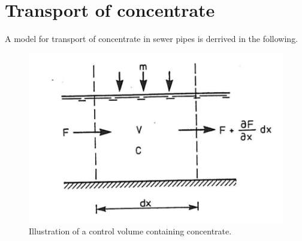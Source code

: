 \section{Transport of concentrate}\label{se:transport_of_concentrate}

A model for transport of concentrate in sewer pipes is derrived in the following.

\begin{figure}[H]
\centering
\includegraphics[width=.6\textwidth]{report/modeling/pictures/poopvolume.png}
\caption{Illustration of a control volume containing concentrate.}
\label{fig:poopvolume}
\end{figure} 




